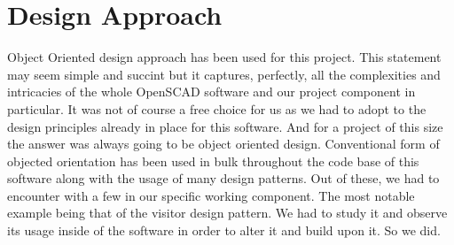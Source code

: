 \section{Design Approach}
Object Oriented design approach has been used for this project. This statement may seem simple and succint but it captures, perfectly, all the complexities and intricacies of the whole OpenSCAD software and our project component in particular.
It was not of course a free choice for us as we had to adopt to the design principles already in place for this software. And for a project of this size the answer was always going to be object oriented design. Conventional form of objected orientation has been used in bulk throughout the code base of this software along with the usage of many design patterns. Out of these, we had to encounter with a few in our specific working component. The most notable example being that of the visitor design pattern. We had to study it and observe its usage inside of the software in order to alter it and build upon it. So we did. 
